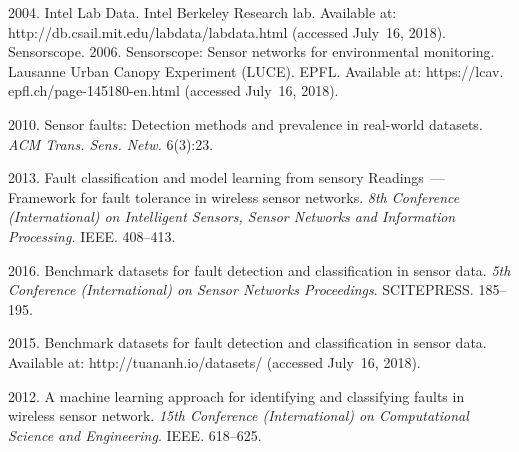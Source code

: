 \begin{multicols}{2}
{{\begin{thebibliography}{99}
 2004. Intel Lab 
Data. Intel Berkeley Research lab. Available at: 
{\sf http://db.csail.mit.edu/\linebreak labdata/labdata.html} 
(accessed July~16, 2018).
Sensorscope. 2006. Sensorscope: Sensor networks for environmental monitoring. Lausanne Urban 
Canopy Experiment (LUCE). EPFL. Available at: {\sf  
https://lcav. epfl.ch/page-145180-en.html} (accessed July~16, 2018).
\vspace*{2pt}

 2010. Sensor faults: Detection methods 
and prevalence in real-world datasets. \textit{ACM Trans. Sens. Netw.} 
6(3):23. 
\vspace*{2pt}

 2013. Fault classification and model learning from 
sensory Readings~--- Framework for fault tolerance in wireless sensor networks. 
\textit{8th Conference 
(International) on Intelligent Sensors, Sensor Networks and Information Processing.} 
IEEE. 408--413.
\vspace*{2pt}

 2016. Benchmark datasets for fault 
detection and classification in sensor data. \textit{5th Conference (International) on Sensor 
Networks Proceedings}. SCITEPRESS. 185--195.
\vspace*{2pt}

 2015. Benchmark datasets for fault 
detection and classification in sensor data. Available at: {\sf http://tuananh.io/datasets/} (accessed 
July~16, 2018).
\vspace*{2pt}

 2012. A machine learning approach for identifying 
and classifying faults in wireless sensor network. 
\textit{15th Conference (International) on Computational Science and Engineering}. 
 IEEE. 618--625.
\end{thebibliography}

 }
 }

\end{multicols}


